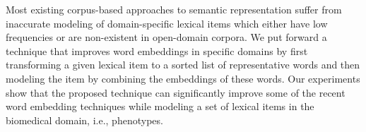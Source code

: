 Most existing corpus-based approaches to semantic representation suffer from inaccurate modeling of domain-specific lexical items which either have low frequencies or are non-existent in open-domain corpora. We put forward a technique that improves word embeddings in specific domains by first transforming a given lexical item to a sorted list of representative words and then modeling the item by combining the embeddings of these words. Our experiments show that the proposed technique can significantly improve some of the recent word embedding techniques while modeling a set of lexical items in the biomedical domain, i.e., phenotypes.
